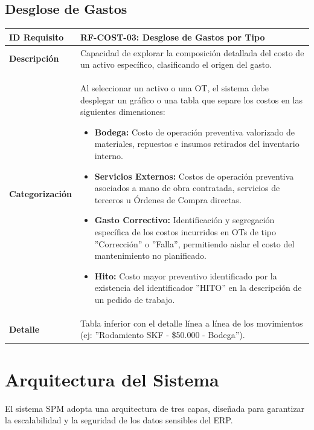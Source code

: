 \documentclass[11pt, letterpaper]{article}
\begin{document}
\subsection{Desglose de Gastos}
\begin{longtable}{|p{3.5cm}|p{11.5cm}|}
\hline
\rowcolor{headergray} \textbf{ID Requisito} & \textbf{RF-COST-03: Desglose de Gastos por Tipo} \\ \hline
\textbf{Descripción} & Capacidad de explorar la composición detallada del costo de un activo específico, clasificando el origen del gasto. \\ \hline
\textbf{Categorización} & Al seleccionar un activo o una OT, el sistema debe desplegar un gráfico o una tabla que separe los costos en las siguientes dimensiones:
\begin{itemize}
    \item \textbf{Bodega:} Costo de operación preventiva valorizado de materiales, repuestos e insumos retirados del inventario interno.
    \item \textbf{Servicios Externos:} Costos de operación preventiva asociados a mano de obra contratada, servicios de terceros u Órdenes de Compra directas.
    \item \textbf{Gasto Correctivo:} Identificación y segregación específica de los costos incurridos en OTs de tipo ''Corrección'' o ''Falla'', permitiendo aislar el costo del mantenimiento no planificado.
    \item \textbf{Hito:} Costo mayor preventivo identificado por la existencia del identificador ''HITO'' en la descripción de un pedido de trabajo.
    
\end{itemize} \\ \hline
\textbf{Detalle} & Tabla inferior con el detalle línea a línea de los movimientos (ej: ''Rodamiento SKF - \$50.000 - Bodega''). \\ \hline
\end{longtable}

\section{Arquitectura del Sistema}

El sistema SPM adopta una arquitectura de tres capas, diseñada para garantizar la escalabilidad y la seguridad de los datos sensibles del ERP.
\end{document}
